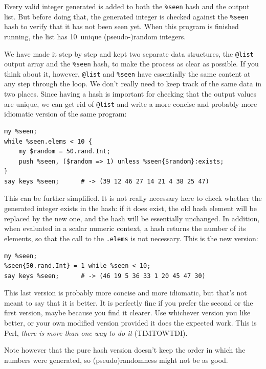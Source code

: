 Every valid integer generated is added to both the \verb'%seen' 
hash and the output list. But before doing 
that, the generated integer is checked against the 
\verb'%seen' hash to verify that it has not been seen yet. 
When this program is finished running, the list has 10~unique 
(pseudo-)random integers.

We have made it step by step and kept two separate data 
structures, the \verb'@list' output array and the 
\verb'%seen' hash, to make the process as clear as possible. 
If you think about it, however, \verb'@list' and \verb'%seen' 
have essentially the same content at any step through the 
loop. We don't really need to keep track of the same data in 
two places. Since having a hash is important for checking that the 
output values are unique, we can get rid of \verb'@list' 
and write a more concise and probably more idiomatic version 
of the same program:

\begin{verbatim}
my %seen;
while %seen.elems < 10 {
	my $random = 50.rand.Int;
	push %seen, ($random => 1) unless %seen{$random}:exists;
}
say keys %seen;      # -> (39 12 46 27 14 21 4 38 25 47)
\end{verbatim}

This can be further simplified. It is not really necessary 
here to check whether the generated integer exists in the 
hash: if it does exist, the old hash element will be replaced 
by the new one, and the hash will be essentially unchanged. In 
addition, when evaluated in a scalar numeric context, a 
hash returns the number of its elements, so that the call 
to the {\tt .elems} is not necessary. This is the new version:

\begin{verbatim}
my %seen;
%seen{50.rand.Int} = 1 while %seen < 10;
say keys %seen;      # -> (46 19 5 36 33 1 20 45 47 30)
\end{verbatim}

This last version is probably more concise and more idiomatic, 
but that's not meant to say that it is better. It is 
perfectly fine if you prefer the second or the first version, 
maybe because you find it clearer. Use whichever version you 
like better, or your own modified version provided it does 
the expected work. This is Perl, \emph{there 
is more than one way to do it} (TIMTOWTDI).

Note however that the pure hash version doesn't keep the order 
in which the numbers were generated, so (pseudo)randomness 
might not be as good.

